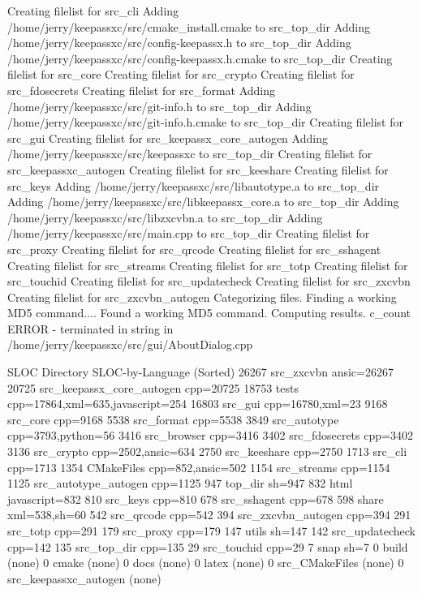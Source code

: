 \documentclass[12pt]{article}
\begin{document}
{Creating filelist for src_cli
Adding /home/jerry/keepassxc/src/cmake_install.cmake to src_top_dir
Adding /home/jerry/keepassxc/src/config-keepassx.h to src_top_dir
Adding /home/jerry/keepassxc/src/config-keepassx.h.cmake to src_top_dir
Creating filelist for src_core
Creating filelist for src_crypto
Creating filelist for src_fdosecrets
Creating filelist for src_format
Adding /home/jerry/keepassxc/src/git-info.h to src_top_dir
Adding /home/jerry/keepassxc/src/git-info.h.cmake to src_top_dir
Creating filelist for src_gui
Creating filelist for src_keepassx_core_autogen
Adding /home/jerry/keepassxc/src/keepassxc to src_top_dir
Creating filelist for src_keepassxc_autogen
Creating filelist for src_keeshare
Creating filelist for src_keys
Adding /home/jerry/keepassxc/src/libautotype.a to src_top_dir
Adding /home/jerry/keepassxc/src/libkeepassx_core.a to src_top_dir
Adding /home/jerry/keepassxc/src/libzxcvbn.a to src_top_dir
Adding /home/jerry/keepassxc/src/main.cpp to src_top_dir
Creating filelist for src_proxy
Creating filelist for src_qrcode
Creating filelist for src_sshagent
Creating filelist for src_streams
Creating filelist for src_totp
Creating filelist for src_touchid
Creating filelist for src_updatecheck
Creating filelist for src_zxcvbn
Creating filelist for src_zxcvbn_autogen
Categorizing files.
Finding a working MD5 command....
Found a working MD5 command.
Computing results.
c_count ERROR - terminated in string in /home/jerry/keepassxc/src/gui/AboutDialog.cpp


SLOC    Directory       SLOC-by-Language (Sorted)
26267   src_zxcvbn      ansic=26267
20725   src_keepassx_core_autogen cpp=20725
18753   tests           cpp=17864,xml=635,javascript=254
16803   src_gui         cpp=16780,xml=23
9168    src_core        cpp=9168
5538    src_format      cpp=5538
3849    src_autotype    cpp=3793,python=56
3416    src_browser     cpp=3416
3402    src_fdosecrets  cpp=3402
3136    src_crypto      cpp=2502,ansic=634
2750    src_keeshare    cpp=2750
1713    src_cli         cpp=1713
1354    CMakeFiles      cpp=852,ansic=502
1154    src_streams     cpp=1154
1125    src_autotype_autogen cpp=1125
947     top_dir         sh=947
832     html            javascript=832
810     src_keys        cpp=810
678     src_sshagent    cpp=678
598     share           xml=538,sh=60
542     src_qrcode      cpp=542
394     src_zxcvbn_autogen cpp=394
291     src_totp        cpp=291
179     src_proxy       cpp=179
147     utils           sh=147
142     src_updatecheck cpp=142
135     src_top_dir     cpp=135
29      src_touchid     cpp=29
7       snap            sh=7
0       build           (none)
0       cmake           (none)
0       docs            (none)
0       latex           (none)
0       src_CMakeFiles  (none)
0       src_keepassxc_autogen (none)


}
\end{document}
